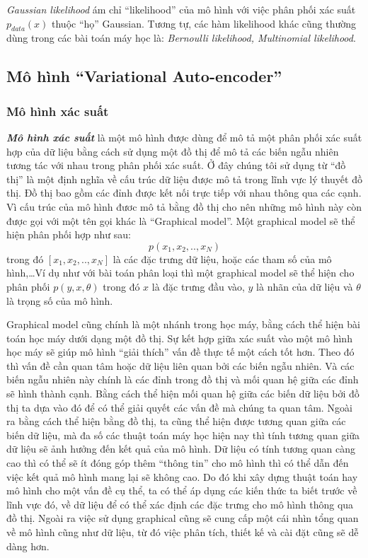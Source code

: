         \textit{Gaussian likelihood} ám chỉ ``likelihood'' của mô hình với việc phân phối xác suất $p_{data}(x)$ thuộc ``họ'' Gaussian.
        Tương tự, các hàm likelihood khác cũng thường dùng trong các bài toán máy học là:
        \textit{Bernoulli likelihood, Multinomial likelihood}.
        
        

        
    


    \subsection{Mô hình ``Variational Auto-encoder''} 
        \subsubsection{Mô hình xác suất}
        \textbf{\textit{Mô hình xác suất}} là một mô hình được dùng để mô tả một phân 
        phối xác suất hợp của dữ liệu bằng cách sử dụng một đồ thị để mô tả các biến 
        ngẫu nhiên tương tác với nhau trong phân phối xác suất. Ở đây 
        chúng tôi sử dụng từ ``đồ thị'' là một định nghĩa về cấu trúc 
        dữ liệu được mô tả trong lĩnh vực lý thuyết đồ thị. Đồ thị 
        bao gồm các đỉnh được kết nối trực tiếp với nhau thông qua 
        các cạnh. Vì cấu trúc của mô hình đươc mô tả bằng đồ thị cho 
        nên những mô hình này còn được gọi với một tên gọi khác là 
        ``Graphical model''. 
        Một graphical model sẽ thể hiện phân phối hợp như sau:
        $$p(x_1,x_2, .. ,x_N)$$
        trong đó $[x_1,x_2,..,x_N]$ là các đặc trưng dữ liệu, hoặc các tham số của mô hình,\dots Ví dụ như với bài toán phân loại thì một graphical model sẽ thể hiện cho phân phối $p(y,x, \theta)$ trong đó $x$ là đặc trưng đầu vào, $y$ là nhãn của dữ liệu và $\theta$ là trọng số của mô hình. 

        Graphical model cũng chính là một nhánh trong học máy, bằng cách thể hiện bài toán học máy dưới dạng một đồ thị. 
        Sự kết hợp giữa xác suất vào một mô hình học máy sẽ giúp mô hình ``giải thích'' vấn đề thực tế một cách tốt hơn. 
        Theo đó thì vấn đề cần quan tâm hoặc dữ liệu liên quan bởi các biến ngẫu nhiên. Và các biến ngẫu nhiên này chính là các đỉnh trong đồ thị và mối quan hệ giữa các đỉnh sẽ hình thành cạnh. Bằng cách thể hiện mối quan hệ giữa các biến dữ liệu bởi đồ thị ta dựa vào đó để có thể giải quyết các vấn đề mà chúng ta quan tâm. Ngoài ra bằng cách thể hiện bằng đồ thị, ta cũng thể hiện được tương quan giữa các biến dữ liệu, mà đa số các thuật toán máy học hiện nay thì tính tương quan giữa dữ liệu sẽ ảnh hưởng đến kết quả của mô hình. Dữ liệu có tính tương quan càng cao thì có thể sẽ ít đóng góp thêm ``thông tin'' cho mô hình thì có thể dẫn đến việc kết quả mô hình mang lại sẽ không cao. Do đó khi xây dựng thuật toán hay mô hình cho một vấn đề cụ thể, ta có thể áp dụng các kiến thức ta biết trước về lĩnh vực đó, về dữ liệu để có thể xác định các đặc trưng cho mô hình thông qua đồ thị. Ngoài ra việc sử dụng graphical cũng sẽ cung cấp một cái nhìn tổng quan về mô hình cũng như dữ liệu, từ đó việc phân tích, thiết kế và cài đặt cũng sẽ dễ dàng hơn.

